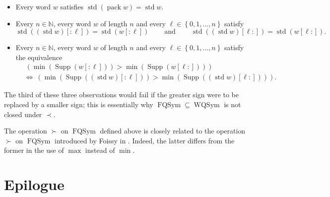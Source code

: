 \documentclass[numbers=enddot,12pt,final,onecolumn,notitlepage,abstracton]{scrartcl}%
\theoremstyle{definition}
\begin{document}
\begin{itemize}
\item Every word $w$ satisfies $\operatorname*{std}\left(
\operatorname*{pack}w\right)  =\operatorname*{std}w$.

\item Every $n\in\mathbb{N}$, every word $w$ of length $n$ and every $\ell
\in\left\{  0,1,\ldots,n\right\}  $ satisfy
\[
\operatorname*{std}\left(  \left(  \operatorname*{std}w\right)  \left[
:\ell\right]  \right)  =\operatorname*{std}\left(  w\left[  :\ell\right]
\right)  \ \ \ \ \ \ \ \ \ \ \text{and}\ \ \ \ \ \ \ \ \ \ \operatorname*{std}%
\left(  \left(  \operatorname*{std}w\right)  \left[  \ell:\right]  \right)
=\operatorname*{std}\left(  w\left[  \ell:\right]  \right)  .
\]


\item Every $n\in\mathbb{N}$, every word $w$ of length $n$ and every $\ell
\in\left\{  0,1,\ldots,n\right\}  $ satisfy the equivalence%
\begin{align*}
&  \ \left(  \min\left(  \operatorname*{Supp}\left(  w\left[  :\ell\right]
\right)  \right)  >\min\left(  \operatorname*{Supp}\left(  w\left[
\ell:\right]  \right)  \right)  \right) \\
&  \Longleftrightarrow\ \left(  \min\left(  \operatorname*{Supp}\left(
\left(  \operatorname*{std}w\right)  \left[  :\ell\right]  \right)  \right)
>\min\left(  \operatorname*{Supp}\left(  \left(  \operatorname*{std}w\right)
\left[  \ell:\right]  \right)  \right)  \right)  .
\end{align*}

\end{itemize}

The third of these three observations would fail if the greater sign were to
be replaced by a smaller sign; this is essentially why $\operatorname*{FQSym}%
\subseteq\operatorname*{WQSym}$ is not closed under $\left.  \prec\right.  $.

The operation $\left.  \succ\right.  $ on $\operatorname*{FQSym}$ defined
above is closely related to the operation $\left.  \succ\right.  $ on
$\operatorname*{FQSym}$ introduced by Foissy in \cite[Section 4.2]{Foissy07}.
Indeed, the latter differs from the former in the use of $\max$ instead of
$\min$.

\section{\label{sect.epilogue}Epilogue}
\end{document}
